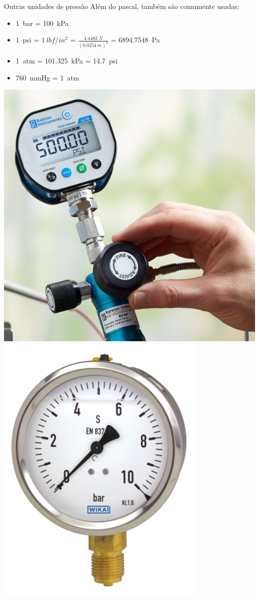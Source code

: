 \documentclass[t,%
brazilian,%
11pt,%
aspectratio=169,%
table%
]{beamer}
\begin{document}
\begin{frame}{Outras unidades de pressão}
    Além do pascal, também são comumente usadas:
    \begin{itemize}
        \item \SI{1}{bar} = \SI{100}{kPa}\
        \item \SI{1}{psi} = \(\SI{1}{lbf/in^2}\) = \(\displaystyle \frac{\SI{4.4482}{N}}{(\SI{0.0254}{m})^2}\) = \SI{6894.7548}{Pa}
        \item \SI{1}{atm} = \SI{101.325}{kPa} = \SI{14.7}{psi}
        \item \SI{760}{mmHg} = \SI{1}{atm}
    \end{itemize}
    \centering
    \includegraphics[height=\textheight-106pt]{images/manometro-digital-medidor-de-pressao-digital-lc10-1-600x600.jpg}
    \includegraphics[height=\textheight-106pt]{images/213.53.jpg}

\end{frame}
\end{document}
